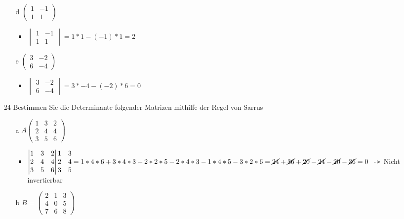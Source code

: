 \documentclass{article}
\begin{document}
\begin{itemize}
\begin{itemize}
\begin{itemize}
			\end{itemize}
			\item[d]{$\begin{pmatrix} 1 & -1 \\ 1 & 1 \end{pmatrix}$}
			\begin{itemize}
				\item{$\begin{vmatrix} 1 & -1 \\ 1 & 1 \end{vmatrix}=1*1-(-1)*1=2$}
			\end{itemize}
			\item[e]{$\begin{pmatrix} 3 & -2 \\ 6 & -4 \end{pmatrix}$}
			\begin{itemize}
				\item{$\begin{vmatrix} 3 & -2 \\ 6 & -4 \end{vmatrix}=3*-4-(-2)*6=0$}
			\end{itemize}
		\end{itemize}
		\item[24]{Bestimmen Sie die Determinante folgender Matrizen mithilfe der Regel von Sarrus}
		\begin{itemize}
			\item[a]{$A \begin{pmatrix} 1 & 3 & 2 \\ 2 & 4 & 4 \\ 3 & 5 & 6 \end{pmatrix}	$}
			\begin{itemize}
				\item{$\begin{vmatrix} 1 & 3 & 2 \\ 2 & 4 & 4 \\ 3 & 5 & 6 \end{vmatrix}\begin{matrix} 1 & 3 \\ 2 & 4 \\ 3 & 5 \end{matrix}=1*4*6+3*4*3+2*2*5-2*4*3-1*4*5-3*2*6=\cancel{24}+\cancel{36}+\cancel{20}-\cancel{24}-\cancel{20}-\cancel{36}=0$\texttt{ -> }Nicht invertierbar}
			\end{itemize}
			\item[b]{$B=\begin{pmatrix} 2 & 1 & 3 \\ 4 & 0 & 5 \\ 7 & 6 & 8 \end{pmatrix}$}

\end{itemize}
\end{itemize}
\end{document}
